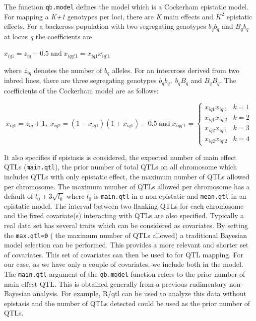 \documentclass{article}
\begin{document}
The function {\tt qb.model} defines the model which is a Cockerham
epistatic model. For mapping a  \textit{K+1} genotypes per loci,
there are \textit{K} main effects and $K^{2}$ epistatic effects. For
a backcross population with two segregating genotypes $b_{q}b_{q}$
and $B_{q}b_{q}$ at locus \textit{q} the coefficients are

$x_{iq1} = z_{iq} - 0.5\; \mbox{and} \;x_{iqq'1} = x_{iq1}x_{iq'1}$

where $z_{iq}$ denotes the number of $b_{q}$ alleles. For an
intercross derived from two inbred lines, there are three
segregating genotypes $ b_{q}b_{q},\; b_{q}B_{q}$ and $B_{q}B_{q}$.
The coefficients of the Cockerham model are as follows:

$$x_{iq1} = z_{iq} + 1,\; x_{iq2} = (1-x_{iq1})(1+x_{iq1})-0.5\; \mbox{and}\;
x_{iqq'1}=\left \{\begin{array}{cc}
               x_{iq1}x_{iq'1} & k=1 \\
               x_{iq1}x_{iq'2} & k=2 \\
               x_{iq2}x_{iq'1} & k=3 \\
               x_{iq2}x_{iq'2} & k=4
             \end{array} \right.
  $$

 It also specifies if epistasis is considered, the expected number
 of main effect QTLs ({\tt main.qtl}), the prior number of total QTLs on all
 chromosome which includes QTLs with only epistatic effect,
 the maximum number of QTLs allowed per chromosome. The maximum number of
 QTLs allowed per chromosome has a default of $l_{0}+3\sqrt{l_{0}}$ where
$l_{0}$ is {\tt main.qtl} in a non-epistatic and
 {\tt mean.qtl} in an epistatic model. The interval
between two flanking QTLs for each chromosome and the fixed
covariate(s) interacting with QTLs are also specified. Typically a
real data set has several traits which can be considered as
covariates. By setting the {\tt max.qtl=0} ( the maximum number of
QTLs allowed) a traditional Bayesian model selection can be
performed. This provides a more relevant and shorter set of
covariates. This set of covariates can then be used to for QTL
mapping. For our case, as we have only a couple of covariates, we
include both in the model. The {\tt main.qtl}
argument of the {\tt qb.model} function refers to the prior number
of main effect QTL. This is obtained generally from a previous
rudimentary non-Bayesian analysis. For example, R/qtl can be used to
analyze this data without epistasis and the number of QTLs detected
could be used as the prior number of QTLs.
 
\end{document}
